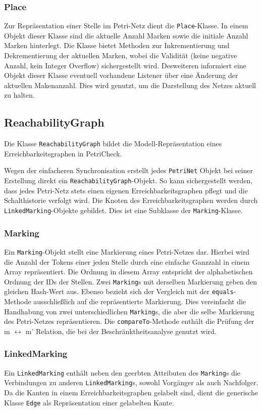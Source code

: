 \subsubsection{Place}
Zur Repräsentation einer Stelle im Petri-Netz dient die \texttt{Place}-Klasse.
In einem Objekt dieser Klasse sind die aktuelle Anzahl Marken sowie die initiale
Anzahl Marken hinterlegt. Die Klasse bietet Methoden zur Inkrementierung und
Dekrementierung der aktuellen Marken, wobei die Validität (keine negative
Anzahl, kein Integer Overflow) sichergestellt wird. Desweiteren informiert eine
Objekt dieser Klasse eventuell vorhandene Listener über eine Änderung der
aktuellen Makenanzahl. Dies wird genutzt, um die Darstellung des Netzes aktuell
zu halten.

\subsection{ReachabilityGraph}
Die Klasse \texttt{ReachabilityGraph} bildet die Modell-Repräsentation eines
Erreichbarkeitsgraphen in PetriCheck.

Wegen der einfacheren Synchronisation erstellt jedes \texttt{PetriNet} Objekt
bei seiner Erstellung direkt ein \texttt{ReachabilityGraph}-Objekt. So kann
sichergestellt werden, dass jedes Petri-Netz stets einen eigenen
Erreichbarkeitsgraphen pflegt und die Schalthistorie verfolgt wird. Die Knoten
des Erreichbarkeitsgraphen werden durch \texttt{LinkedMarking}-Objekte gebildet.
Dies ist eine Subklasse der \texttt{Marking}-Klasse.

\subsubsection{Marking}
Ein \texttt{Marking}-Objekt stellt eine Markierung eines Petri-Netzes dar.
Hierbei wird die Anzahl der Tokens einer jeden Stelle durch eine einfache
Ganzzahl in einem Array repräsentiert. Die Ordnung in diesem Array entspricht
der alphabetischen Ordnung der IDs der Stellen. Zwei \texttt{Marking}s mit
derselben Markierung geben den gleichen Hash-Wert aus. Ebenso bezieht sich der
Vergleich mit der \texttt{equals}-Methode ausschließlich auf die repräsentierte
Markierung. Dies vereinfacht die Handhabung von zwei unterschiedlichen
\texttt{Marking}s, die aber die selbe Markierung des Petri-Netzes
repräsentieren. Die \texttt{compareTo}-Methode enthält die Prüfung der m
$\leftrightarrow$ m' Relation, die bei der Beschränktheitsanalyse genutzt wird.

\subsubsection{LinkedMarking}
Ein \texttt{LinkedMarking} enthält neben den geerbten Attributen des
\texttt{Marking}s die Verbindungen zu anderen \texttt{LinkedMarking}s, sowohl
Vorgänger als auch Nachfolger. Da die Kanten in einem Erreichbarkeitsgraphen
gelabelt sind, dient die generische Klasse \texttt{Edge} als Repräsentation
einer gelabelten Kante.

